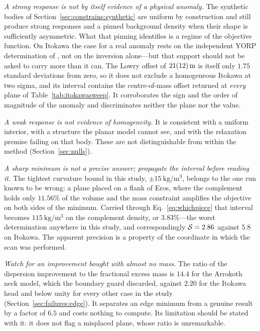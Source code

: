 \emph{A strong response is not by itself evidence of a physical anomaly.}
The synthetic bodies of Section~\ref{sec:constrains:synthetic} are uniform
by construction and still produce strong responses and a pinned background
density when their shape is sufficiently asymmetric. What that pinning
identifies is a regime of the objective function. On Itokawa the case for a
real anomaly rests on the independent YORP determination of
\citet{lowry2014}, not on the inversion alone---but that support should not
be asked to carry more than it can. The Lowry offset of
$\SI{21+-12}{\metre}$ is itself only $1.75$ standard deviations from zero,
so it does not exclude a homogeneous Itokawa at two sigma, and its interval
contains the centre-of-mass offset returned at \emph{every} plane of
Table~\ref{tab:itokawasweep}. It corroborates the sign and the order of
magnitude of the anomaly and discriminates neither the plane nor the value.

\emph{A weak response is not evidence of homogeneity.} It is consistent with
a uniform interior, with a structure the planar model cannot see, and with
the relaxation premise failing on that body. These are not distinguishable
from within the method (Section~\ref{sec:nulls}).

\emph{A sharp minimum is not a precise answer; propagate the interval before
reading it.} The tightest curvature bound in this study,
$\pm\SI{15}{\kilo\gram\per\cubic\metre}$, belongs to the one run known to be
wrong: a plane placed on a flank of Eros, where the complement holds only
$11.56\%$ of the volume and the mass constraint amplifies the objective on
both sides of the minimum. Carried through Eq.~\eqref{eq:whichpiece} that
interval becomes $\SI{115}{\kilo\gram\per\cubic\metre}$ on the complement
density, or $3.83\%$---the worst determination anywhere in this study, and
correspondingly $\mathcal{S} = 2.86$ against $5.8$ on Itokawa. The apparent
precision is a property of the coordinate in which the scan was performed.

\emph{Watch for an improvement bought with almost no mass.} The ratio of the
dispersion improvement to the fractional excess mass is $14.4$ for the
Arrokoth neck model, which the boundary guard discarded, against $2.20$ for
the Itokawa head and below unity for every other case in the study
(Section~\ref{sec:failures:edge}). It separates an edge minimum from a
genuine result by a factor of $6.5$ and costs nothing to compute. Its
limitation should be stated with it: it does not flag a misplaced plane,
whose ratio is unremarkable.

